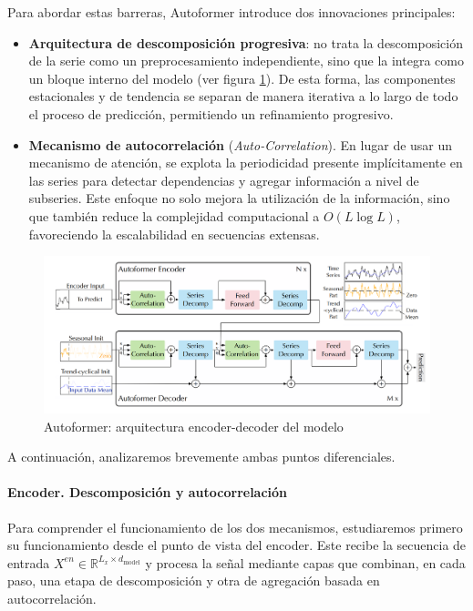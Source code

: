 Para abordar estas barreras, Autoformer introduce dos innovaciones principales:
\begin{itemize}
	\item \textbf{Arquitectura de descomposición progresiva}: no trata la descomposición de la serie como un preprocesamiento independiente, sino que la integra como un bloque interno del modelo (ver figura \ref{autformer}). De esta forma, las componentes estacionales y de tendencia se separan de manera iterativa a lo largo de todo el proceso de predicción, permitiendo un refinamiento progresivo.
	\item \textbf{Mecanismo de autocorrelación} (\textit{Auto-Correlation}). En lugar de usar un mecanismo de atención, se explota la periodicidad presente implícitamente en las series para detectar dependencias y agregar información a nivel de subseries. Este enfoque no solo mejora la utilización de la información, sino que también reduce la complejidad computacional a $O(L \log L)$, favoreciendo la escalabilidad en secuencias extensas.
\end{itemize}

\begin{figure}[!ht]
	\centering
	\includegraphics[scale=0.2]{img/autoformer.png}
	\caption{Autoformer: arquitectura encoder-decoder del modelo~\cite{wu2022autoformerdecompositiontransformersautocorrelation}}
	\label{autformer}
\end{figure}

A continuación, analizaremos brevemente ambas puntos diferenciales.

\paragraph{Encoder. Descomposición y autocorrelación} 
Para comprender el funcionamiento de los dos mecanismos, estudiaremos primero su funcionamiento desde el punto de vista del encoder. Este recibe la secuencia de entrada \(X^{en} \in \mathbb{R}^{L_x \times d_{\text{model}}}\) y procesa la señal mediante capas que combinan, en cada paso, una etapa de descomposición y otra de agregación basada en autocorrelación. \\

